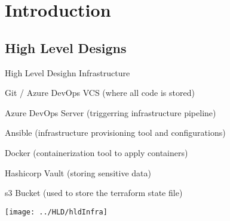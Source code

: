 \section{Introduction}\label{sec:introduction}

\subsection{High Level Designs}\label{subsec:high-level-designs}

\begin{frame}{High Level Desighn Infrastructure}
    \vspace*{.5cm}
    \begin{itemize}
         {
            \vfill \item<1-| alert@1> Git / Azure DevOps VCS (where all code is stored)
        }
         {
            \vfill \item<2-| alert@2> Azure DevOps Server (triggerring infrastructure pipeline)
        }
         {
            \vfill \item<3-| alert@3> Ansible (infrastructure provisioning tool and configurations)
        }
         {
            \vfill \item<4-| alert@4> Docker (containerization tool to apply containers)
        }
         {
            \vfill \item<5-| alert@5> Hashicorp Vault (storing sensitive data)
        }
         {
            \vfill \item<6-| alert@6> s3 Bucket (used to store the terraform state file)
        }
    \end{itemize}
    \vspace*{-.7cm}
    \begin{center}
        \item[] \texttt{[image: ../HLD/hldInfra]}
    \end{center}
\end{frame}

